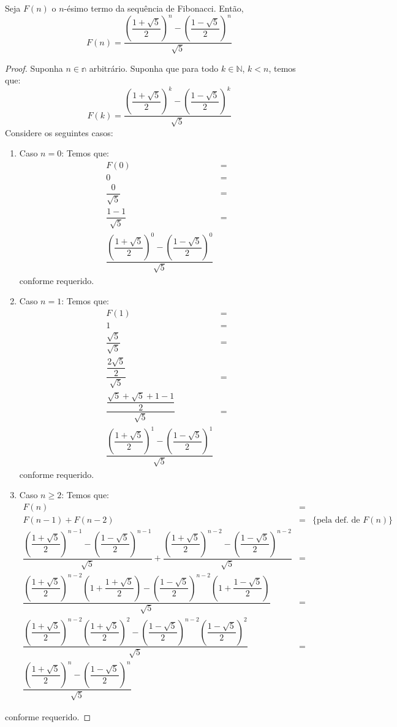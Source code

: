 \begin{Theorem}
Seja $F(n)$ o $n$-ésimo termo da sequência de Fibonacci. Então,
\[
F(n) = \dfrac{\left(\dfrac{1 + \sqrt{5}}{2}\right)^n - \left(\dfrac{1 - \sqrt{5}}{2}\right)^n}{\sqrt{5}}
\]
\end{Theorem}
\begin{proof}
Suponha $n\in\mathbb{n}$ arbitrário. Suponha que para todo
$k\in\mathbb{N}$, $k < n$, temos que:
\[
F(k) = \dfrac{\left(\dfrac{1 + \sqrt{5}}{2}\right)^k - \left(\dfrac{1 - \sqrt{5}}{2}\right)^k}{\sqrt{5}}
\]
 Considere os seguintes casos:
\begin{enumerate}
  \item Caso $n = 0$: Temos que:
  \[
\begin{array}{lc}
    F(0) & =\\
    0     & = \\
    \dfrac{0}{\sqrt{5}} & = \\
    \dfrac{1 - 1}{\sqrt{5}} & = \\
    \dfrac{\left(\dfrac{1 + \sqrt{5}}{2}\right)^0 - \left(\dfrac{1 - \sqrt{5}}{2}\right)^0}{\sqrt{5}}
\end{array}
  \]
  conforme requerido.
  \item Caso $n = 1$: Temos que:
  \[
\begin{array}{lc}
    F(1) & =\\
    1     & = \\
    \dfrac{\sqrt{5}}{\sqrt{5}} & = \\
    \dfrac{\dfrac{2\sqrt{5}}{2}}{\sqrt{5}} & = \\
    \dfrac{\dfrac{\sqrt{5} + \sqrt{5} + 1 - 1}{2}}{\sqrt{5}} & = \\
    \dfrac{\left(\dfrac{1 + \sqrt{5}}{2}\right)^1 - \left(\dfrac{1 - \sqrt{5}}{2}\right)^1}{\sqrt{5}}
\end{array}
  \]
  conforme requerido.
  \item Caso $n\geq 2$: Temos que:
\[
\begin{array}{lcl}
F(n) & = \\
F(n - 1) + F(n - 2) & = & \{\text{pela def. de }F(n)\}\\
\dfrac{\left(\dfrac{1 + \sqrt{5}}{2}\right)^{n - 1} - \left(\dfrac{1 -
      \sqrt{5}}{2}\right)^{n - 1}}{\sqrt{5}} +
\dfrac{\left(\dfrac{1 + \sqrt{5}}{2}\right)^{n - 2} - \left(\dfrac{1 -
      \sqrt{5}}{2}\right)^{n - 2}}{\sqrt{5}} & = \\
\dfrac{\left(\dfrac{1 + \sqrt{5}}{2}\right)^{n - 2}\left(1 + \dfrac{1
      + \sqrt{5}}{2}\right) - \left(\dfrac{1 - \sqrt{5}}{2}\right)^{n - 2}\left(1 + \dfrac{1
      - \sqrt{5}}{2}\right)}{\sqrt{5}} & = \\
\dfrac{\left(\dfrac{1 + \sqrt{5}}{2}\right)^{n - 2}\left(\dfrac{1
      + \sqrt{5}}{2}\right)^2 - \left(\dfrac{1 - \sqrt{5}}{2}\right)^{n - 2}\left(\dfrac{1
      - \sqrt{5}}{2}\right)^2}{\sqrt{5}} & = \\
\dfrac{\left(\dfrac{1 + \sqrt{5}}{2}\right)^n - \left(\dfrac{1 - \sqrt{5}}{2}\right)^n}{\sqrt{5}}
\end{array}
\]
\end{enumerate}
conforme requerido.
\end{proof}

